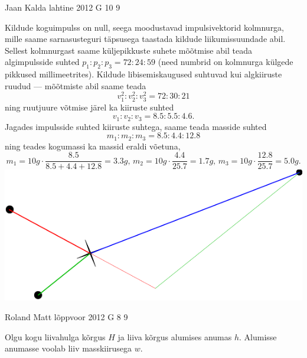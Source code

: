 \documentclass[11pt]{article}
\begin{document}
{%
{Jaan Kalda} %
{lahtine} %
{2012} %
{G 10} %
{9} %
{

\ifSolution
Kildude koguimpulss on null, seega moodustavad impulsivektorid kolmnurga, mille saame sarnasusteguri täpsusega taastada kildude liikumissuundade abil.
Sellest kolmnurgast saame küljepikkuste suhete mõõtmise abil teada algimpulsside suhted $p_1 : p_2: p_3 = \num{72} : \num{24} : \num{59}$ (need numbrid on 
kolmnurga külgede pikkused millimeetrites). 
Kildude libisemiskaugused suhtuvad kui algkiiruste ruudud --- mõõtmiste abil saame teada 
\[
v_1^2:v_2^2:v_3^2 = \num{72}:\num{30}:\num{21}
\]
ning ruutjuure võtmise järel ka 
kiiruste suhted
\[
v_1 : v_2: v_3 = \num{8,5}:\num{5,5}:\num{4,6}.
\]
Jagades impulsside suhted kiiruste suhtega, saame teada masside suhted
\[
m_1:m_2:m_3=\num{8,5}:\num{4,4}:\num{12,8}
\]
ning teades kogumassi ka massid eraldi võetuna,
\[
m_1=\SI {10}g\cdot \frac{\num{8,5}}{\num{8,5}+\num{4,4}+\num{12,8}} = \SI{3,3}g\text{, }m_2=\SI {10}g\cdot \frac{\num{4,4}}{\num{25,7}}=\SI{1,7}g\text{, } 
m_3=\SI {10}g\cdot \frac{\num{12,8}}{\num{25,7}}=\SI{5,0}g.
\]
\hspace*{0\columnwidth}\includegraphics[width=\columnwidth]{2012-lahg-10-killud_lah}
\fi
}

{Roland Matt} %
{lõppvoor} %
{2012} %
{G 8} %
{9} %
{

\ifSolution
Olgu kogu liivahulga kõrgus $H$ ja liiva kõrgus alumises anumas $h$. Alumisse anumasse voolab liiv masskiirusega $w$. 


}}
\end{document}
